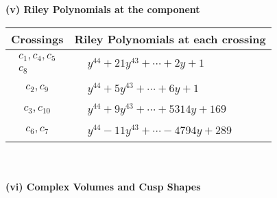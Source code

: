 \documentclass[1p]{elsarticle_modified}
\theoremstyle{definition}
\begin{document}
\newpage\renewcommand{\arraystretch}{1}
\flushleft \textbf{(v) Riley Polynomials at the component}\newline \\
\begin{tabular}{m{50pt}|m{274pt}}
Crossings & \hspace{64pt}Riley Polynomials at each crossing \\
\hline $$\begin{aligned}c_{1},c_{4},c_{5}\\c_{8}\end{aligned}$$&$\begin{aligned}
&y^{44}+21 y^{43}+\cdots+2 y+1
\end{aligned}$\\
\hline $$\begin{aligned}c_{2},c_{9}\end{aligned}$$&$\begin{aligned}
&y^{44}+5 y^{43}+\cdots+6 y+1
\end{aligned}$\\
\hline $$\begin{aligned}c_{3},c_{10}\end{aligned}$$&$\begin{aligned}
&y^{44}+9 y^{43}+\cdots+5314 y+169
\end{aligned}$\\
\hline $$\begin{aligned}c_{6},c_{7}\end{aligned}$$&$\begin{aligned}
&y^{44}-11 y^{43}+\cdots-4794 y+289
\end{aligned}$\\
\hline
\end{tabular}\\~\\
\newpage\flushleft \textbf{(vi) Complex Volumes and Cusp Shapes}
\end{document}
